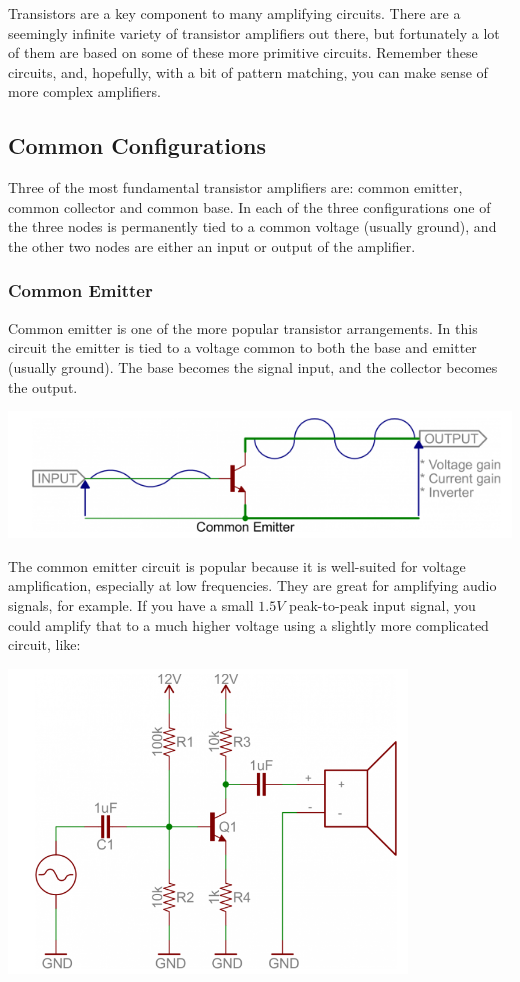 \documentclass[a4paper, 11pt]{article} %
\begin{document}
Transistors are a key component to many amplifying circuits. There are a seemingly infinite variety of transistor amplifiers out there, but fortunately a lot of them are based on some of these more primitive circuits. Remember these circuits, and, hopefully, with a bit of pattern matching, you can make sense of more complex amplifiers.

\subsection*{Common Configurations}

Three of the most fundamental transistor amplifiers are: common emitter, common collector and common base. In each of the three configurations one of the three nodes is permanently tied to a common voltage (usually ground), and the other two nodes are either an input or output of the amplifier.

\subsubsection*{Common Emitter}

Common emitter is one of the more popular transistor arrangements. In this circuit the emitter is tied to a voltage common to both the base and emitter (usually ground). The base becomes the signal input, and the collector becomes the output.

\begin{center}
\includegraphics[width=400pt]{tran22}
\end{center}

The common emitter circuit is popular because it is well-suited for voltage amplification, especially at low frequencies. They are great for amplifying audio signals, for example. If you have a small $1.5V$ peak-to-peak input signal, you could amplify that to a much higher voltage using a slightly more complicated circuit, like:

\begin{center}
\includegraphics[width=300pt]{tran23}
\end{center}
\end{document}
